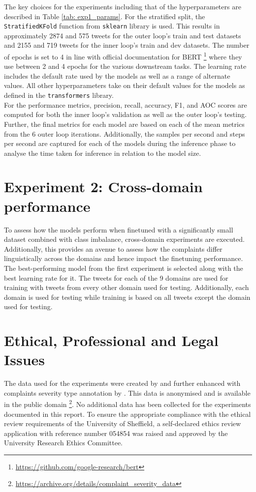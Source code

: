 The key choices for the experiments including that of the hyperparameters are described in Table \ref{tab: exp1_params}. For the stratified split, the \texttt{StratifiedKFold} function from \texttt{sklearn} library is used. This results in approximately 2874 and 575 tweets for the outer loop's train and test datasets and 2155 and 719 tweets for the inner loop's train and dev datasets. The number of epochs is set to 4 in line with official documentation for BERT \footnote{\url{https://github.com/google-research/bert}} where they use between 2 and 4 epochs for the various downstream tasks. The learning rate includes the default rate used by the models as well as a range of alternate values. All other hyperparameters take on their default values for the models as defined in the \texttt{transformers} library.\\

For the performance metrics, precision, recall, accuracy, F1, and AOC scores are computed for both the inner loop's validation as well as the outer loop's testing. Further, the final metrics for each model are based on each of the mean metrics from the 6 outer loop iterations. Additionally, the samples per second and steps per second are captured for each of the models during the inference phase to analyse the time taken for inference in relation to the model size.

\section{Experiment 2: Cross-domain performance}
To assess how the models perform when finetuned with a significantly small dataset combined with class imbalance, cross-domain experiments are executed. Additionally, this provides an avenue to assess how the complaints differ linguistically across the domains and hence impact the finetuning performance. The best-performing model from the first experiment is selected along with the best learning rate for it. The tweets for each of the 9 domains are used for training with tweets from every other domain used for testing. Additionally, each domain is used for testing while training is based on all tweets except the domain used for testing. 

\section{Ethical, Professional and Legal Issues}
The data used for the experiments were created by \cite{preotiuc-pietro_automatically_2019} and further enhanced with complaints severity type annotation by \cite{jinModelingSeverityComplaints2021}. This data is anonymised and is available in the public domain \footnote{\url{ https://archive.org/details/complaint_severity_data}}. No additional data has been collected for the experiments documented in this report. To ensure the appropriate compliance with the ethical review requirements of the University of Sheffield, a self-declared ethics review application with reference number 054854 was raised and approved by the University Research Ethics Committee. 
